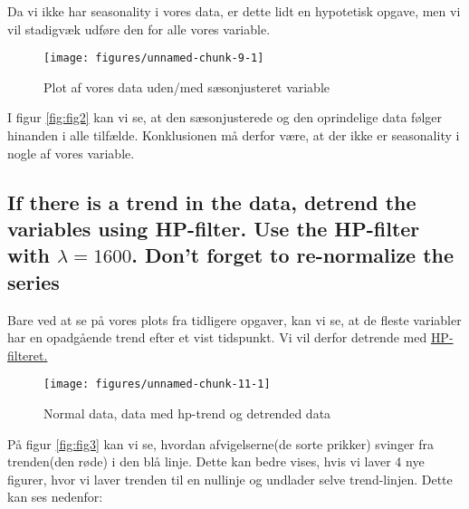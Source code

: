 \documentclass[
  10pt,
]{article}
\begin{document}
Da vi ikke har seasonality i vores data, er dette lidt en hypotetisk
opgave, men vi vil stadigvæk udføre den for alle vores variable.

\begin{figure}[H]

{\centering \texttt{[image: figures/unnamed-chunk-9-1]} 

}

\caption{\label{fig:fig2}Plot af vores data uden/med sæsonjusteret variable}\label{fig:unnamed-chunk-9}
\end{figure}

I figur \ref{fig:fig2} kan vi se, at den sæsonjusterede og den
oprindelige data følger hinanden i alle tilfælde. Konklusionen må derfor
være, at der ikke er seasonality i nogle af vores variable. \newpage

\hypertarget{if-there-is-a-trend-in-the-data-detrend-the-variables-using-hp-filter.-use-the-hp-filter-with-lambda-1600.-dont-forget-to-re-normalize-the-series}{%
\subsection{\texorpdfstring{If there is a trend in the data, detrend the
variables using HP-filter. Use the HP-filter with \(\lambda = 1600\).
Don't forget to re-normalize the
series}{If there is a trend in the data, detrend the variables using HP-filter. Use the HP-filter with \textbackslash lambda = 1600. Don't forget to re-normalize the series}}\label{if-there-is-a-trend-in-the-data-detrend-the-variables-using-hp-filter.-use-the-hp-filter-with-lambda-1600.-dont-forget-to-re-normalize-the-series}}

Bare ved at se på vores plots fra tidligere opgaver, kan vi se, at de
fleste variabler har en opadgående trend efter et vist tidspunkt. Vi vil
derfor detrende med \hyperref[sec:hpfilter]{HP-filteret.}

\begin{figure}[H]

{\centering \texttt{[image: figures/unnamed-chunk-11-1]} 

}

\caption{\label{fig:fig3}Normal data, data med hp-trend og detrended data}\label{fig:unnamed-chunk-11}
\end{figure}

På figur \ref{fig:fig3} kan vi se, hvordan afvigelserne(de sorte
prikker) svinger fra trenden(den røde) i den blå linje. Dette kan bedre
vises, hvis vi laver 4 nye figurer, hvor vi laver trenden til en
nullinje og undlader selve trend-linjen. Dette kan ses nedenfor:
\end{document}
